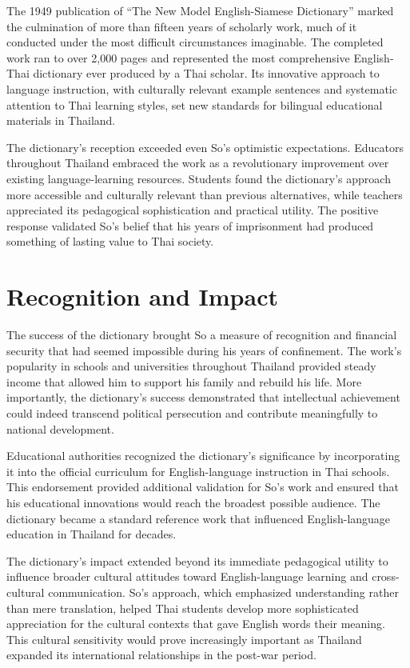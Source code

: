 \documentclass[
  Letterpaper,
]{scrbook}
\begin{document}
The 1949 publication of ``The New Model English-Siamese Dictionary''
marked the culmination of more than fifteen years of scholarly work,
much of it conducted under the most difficult circumstances imaginable.
The completed work ran to over 2,000 pages and represented the most
comprehensive English-Thai dictionary ever produced by a Thai scholar.
Its innovative approach to language instruction, with culturally
relevant example sentences and systematic attention to Thai learning
styles, set new standards for bilingual educational materials in
Thailand.

The dictionary's reception exceeded even So's optimistic expectations.
Educators throughout Thailand embraced the work as a revolutionary
improvement over existing language-learning resources. Students found
the dictionary's approach more accessible and culturally relevant than
previous alternatives, while teachers appreciated its pedagogical
sophistication and practical utility. The positive response validated
So's belief that his years of imprisonment had produced something of
lasting value to Thai society.

\section{Recognition and Impact}\label{recognition-and-impact}

The success of the dictionary brought So a measure of recognition and
financial security that had seemed impossible during his years of
confinement. The work's popularity in schools and universities
throughout Thailand provided steady income that allowed him to support
his family and rebuild his life. More importantly, the dictionary's
success demonstrated that intellectual achievement could indeed
transcend political persecution and contribute meaningfully to national
development.

Educational authorities recognized the dictionary's significance by
incorporating it into the official curriculum for English-language
instruction in Thai schools. This endorsement provided additional
validation for So's work and ensured that his educational innovations
would reach the broadest possible audience. The dictionary became a
standard reference work that influenced English-language education in
Thailand for decades.

The dictionary's impact extended beyond its immediate pedagogical
utility to influence broader cultural attitudes toward English-language
learning and cross-cultural communication. So's approach, which
emphasized understanding rather than mere translation, helped Thai
students develop more sophisticated appreciation for the cultural
contexts that gave English words their meaning. This cultural
sensitivity would prove increasingly important as Thailand expanded its
international relationships in the post-war period.
\end{document}
